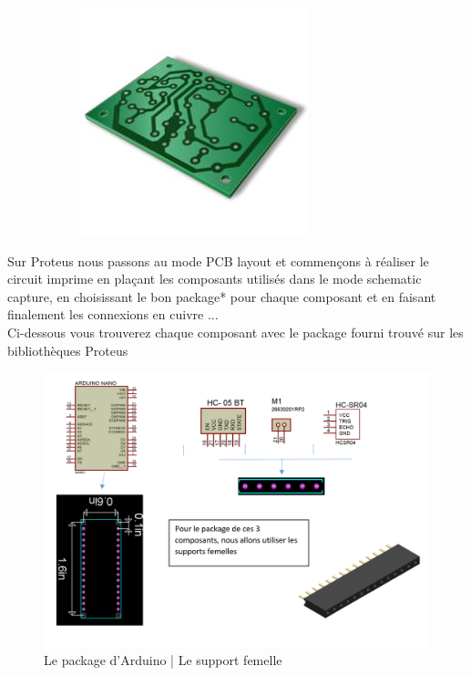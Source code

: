 \begin{figure}[!htbp]
\begin{subfigure}[t]{.45\linewidth}
         \includegraphics[width=\textwidth]{assets/conception1/img32.jpg}
         \caption{}
    \end{subfigure}
\end{figure}

\FloatBarrier

Sur Proteus nous passons au mode PCB layout et commençons à réaliser le circuit imprime en plaçant les composants utilisés dans le mode schematic capture, en choisissant le bon package* pour chaque composant et en faisant finalement les connexions en cuivre ... \\
Ci-dessous vous trouverez chaque composant avec le package fourni trouvé sur les bibliothèques Proteus

\begin{figure}[!htbp]
    \centering
    \includegraphics[width=\textwidth]{assets/conception1/2.png}
    \caption{Le package d'Arduino | Le support femelle}
\end{figure}

